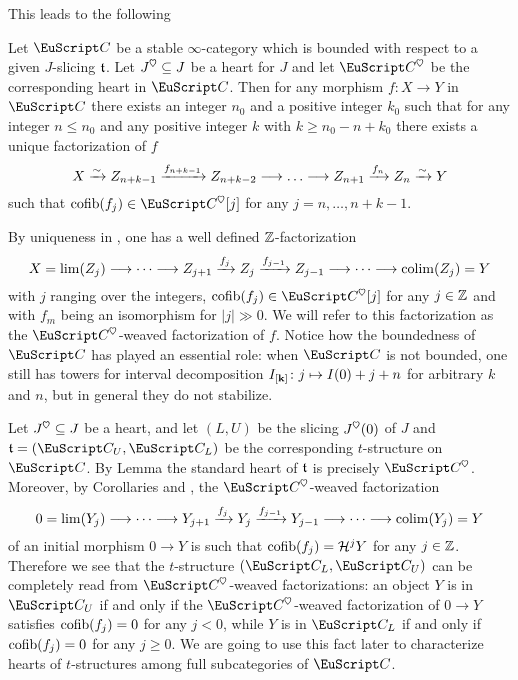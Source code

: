  \par
 This leads to the following
\begin{proposition}\label{prop.Z.Postnikov}
Let $\C$ be a stable $\infty$-category which is bounded with respect to a given $J$-slicing $\mathfrak{t}$. Let $J^\heart\subseteq J$ be a heart for $J$ and let $\C^\heart$ be the corresponding heart in $\C$.
Then for any morphism $f\colon X\to Y$  in $\C$ there exists an integer $n_0$ and a positive integer $k_0$ such that for any integer $n\leq n_0$ and any positive integer $k$ with $k\geq n_0-n+k_0$ there exists a unique factorization of $f$ 
\[
X \xto{\sim} Z_{n+k-1} \xto{f_{n+k-1}}Z_{n+k-2}\to\dots\to Z_{n+1} \xto{f_{n}} Z_{n} \xto{\sim} Y
\]
such that
$\cofib(f_j)\in \C^\heart[j]$ for any $j=n,\dots,n+k-1$.
\end{proposition}
\begin{remark}\label{oss.Z.Postnikov}
By uniqueness in \aprop{}, one has a well defined $\mathbb{Z} $-factorization
\[
X=\lim(Z_j) \longrightarrow\cdots \longrightarrow Z_{j+1} \xrightarrow{f_{j}} Z_{j} \xrightarrow{f_{j-1}}Z_{j-1}\longrightarrow \cdots\longrightarrow \mathrm{colim}(Z_j)=Y
\]
with $j$ ranging over the integers, $\cofib(f_j)\in \C^\heart[j]$ for any $j\in \mathbb{Z} $ and with $f_m$ being an isomorphism for $|j|\gg 0$. We will refer to this factorization as the $\C^\heart$-weaved factorization of $f$. Notice how the boundedness of $\C$ has played an essential role: when $\C$ is not bounded, one still has towers for interval decomposition $I_{[\mathbf{k}]}\colon j\mapsto I(0)+j+n$ for arbitrary $k$ and $n$, but in general they do not stabilize.
\end{remark}
\begin{remark}\label{oss.for.Heart.to.t}
Let $J^\heart\subseteq J$ be a heart, and let $(L,U)$ be the slicing $J^\heart(0)$ of $J$ and $\tee=(\C_U,\C_L)$ be the corresponding $t$-structure on $\C$. By Lemma  the standard heart of $\mathfrak{t}$ is precisely $\C^\heart$. Moreover,
by Corollaries  and , the $\C^\heart$-weaved factorization 
\[
0=\lim(Y_j) \longrightarrow\cdots \longrightarrow Y_{j+1} \xrightarrow{f_{j}} Y_{j} \xrightarrow{f_{j-1}}Y_{j-1}\longrightarrow \cdots\longrightarrow \mathrm{colim}(Y_j)=Y
\]
of an initial morphism $0\to Y$ is such that $\operatorname{cofib}(f_j)=\mathcal{H}^jY$ for any $j\in \mathbb{Z}$. Therefore we see that the $t$-structure $(\C_L,\C_U)$ can be completely read from $\C^\heart$-weaved factorizations: an object $Y$ is in $\C_{U}$ if and only if the $\C^\heart$-weaved factorization of $0\to Y$
satisfies $\operatorname{cofib}(f_j)=0$ for any $j< 0$, while $Y$ is in $\C_{L}$ if and only if  $\operatorname{cofib}(f_j)=0$ for any $j\geq 0$. We are going to use this fact later to characterize hearts of $t$-structures among full subcategories of $\C$.
\end{remark}

